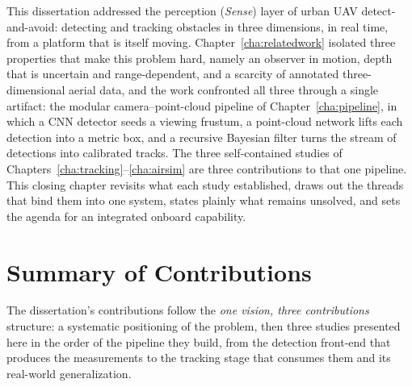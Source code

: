 
This dissertation addressed the perception (\emph{Sense}) layer of urban UAV
detect-and-avoid: detecting and tracking obstacles in three dimensions, in real
time, from a platform that is itself moving. Chapter~\ref{cha:relatedwork}
isolated three properties that make this problem hard, namely an observer in
motion, depth that is uncertain and range-dependent, and a scarcity of annotated
three-dimensional aerial data, and the work confronted all three through a single
artifact: the modular camera--point-cloud pipeline of
Chapter~\ref{cha:pipeline}, in which a CNN detector seeds a viewing frustum, a
point-cloud network lifts each detection into a metric box, and a recursive
Bayesian filter turns the stream of detections into calibrated tracks. The three
self-contained studies of Chapters~\ref{cha:tracking}--\ref{cha:airsim} are three
contributions to that one pipeline. This closing
chapter revisits what each study established, draws out the threads that bind
them into one system, states plainly what remains unsolved, and sets the agenda
for an integrated onboard capability.

\section{Summary of Contributions}

The dissertation's contributions follow the \emph{one vision, three
contributions} structure: a systematic positioning of the problem, then three
studies presented here in the order of the pipeline they build, from the
detection front-end that produces the measurements to the tracking stage that
consumes them and its real-world generalization.

